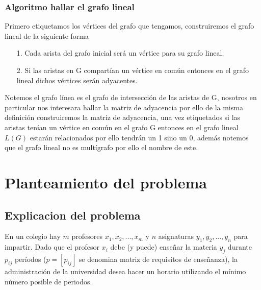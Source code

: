 \documentclass[letterpaper,12pt]{article}
\begin{document}
    \subsubsection{Algoritmo hallar el grafo lineal}
    Primero etiquetamos los vértices del grafo que tengamos, construiremos el grafo lineal de la siguiente forma
    \begin{itemize}
        \item [1.] Cada arista del grafo inicial será un vértice para su grafo lineal. 
        \item[2.] Si las aristas en G compartían un vértice en común entonces en el grafo lineal dichos vértices serán adyacentes.
    \end{itemize}
	Notemos el grafo línea es el grafo de intersección de las aristas de G, nosotros en particular nos interesara hallar la matriz de adyacencia por ello de la misma definición construiremos la matriz de adyacencia, una vez etiquetados si las aristas tenían un vértice en común en el grafo G entonces en el grafo lineal $L(G)$ estarán relacionados por ello tendrán un 1 sino un 0, además notemos que el grafo lineal no es multígrafo por ello el nombre de este.
	\section{Planteamiento del problema}
	\subsection{Explicacion del problema}
	En un colegio hay $m$ profesores $x_{1}, x_{2}, ..., x_{m}$ y $n$ asignaturas $y_{1}, y_{2}, ..., y_{n}$ para impartir. Dado que el profesor $x_{i}$ debe (y puede) enseñar la materia $y_{j}$ durante $p_{ij}$ períodos ($p=[p_{ij}]$ se denomina matriz de requisitos de enseñanza), la administración de la universidad desea hacer un horario utilizando el mínimo número posible de periodos.
\end{document}
